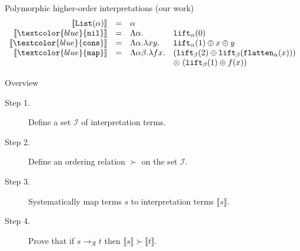 \documentclass[10pt,presentation,color=names]{beamer}
\newcommand{\Rules}{\mathcal{R}}
\newcommand{\Iterms}{\mathcal{I}}
\newcommand{\red}{\longrightarrow}
\newcommand{\flatten}{\mathtt{flatten}}
\newcommand{\lift}{\mathtt{lift}}
\newcommand{\typeinterpret}[1]{\llbracket #1 \rrbracket}
\newcommand{\interpret}[1]{\llbracket #1 \rrbracket}
\newcommand{\symb}[1]{\textcolor{blue}{\mathtt{#1}}}
\newcommand{\List}{\mathtt{List}}
\newcommand{\nil}{\symb{nil}}
\newcommand{\cons}{\symb{cons}}
\newcommand{\map}{\symb{map}}
\begin{document}
\begin{frame}{Polymorphic higher-order interpretations (our work)}
\[
\begin{array}{rcll}
\typeinterpret{\List(\alpha)} & = & \alpha \\
\interpret{\nil} & = & \Lambda \alpha. & \lift_\alpha(0) \\
\interpret{\cons} & = & \Lambda \alpha.\lambda xy. & \lift_\alpha(1) \oplus x \oplus y \\
\interpret{\map} & = & \Lambda \alpha\beta.\lambda f x. & (\lift_\beta(2) \oplus \lift_\beta(\flatten_\alpha(x))) \\
  & & & \otimes\ (\lift_\beta(1) \oplus f(x)) \\
\end{array}
\]
\end{frame}

\begin{frame}{Overview}
\begin{description}
\item[Step 1.] Define a set $\Iterms$ of \alert{interpretation terms}.
\item[Step 2.] Define an ordering relation $\succ$ on the set $\Iterms$.
\item[Step 3.] Systematically map terms $s$ to interpretation terms $\interpret{s}$.
\item[Step 4.] Prove that if $s \red_{\Rules} t$ then $\interpret{s} \succ \interpret{t}$.
\end{description}
\end{frame}
\end{document}
